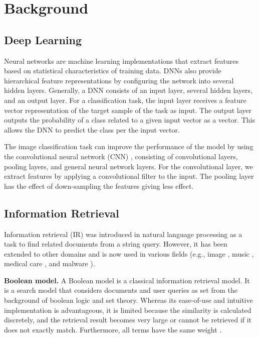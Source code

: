 \section{Background}

\subsection{Deep Learning }

Neural networks are machine learning implementations that extract features based on statistical characteristics of training data. DNNs also provide hierarchical feature representations by configuring the network into several hidden layers. Generally, a DNN consists of an input layer, several hidden layers, and an output layer. For a classification task, the input layer receives a feature vector representation of the target sample of the task as input. The output layer outputs the probability of a class related to a given input vector as a vector. This allows the DNN to predict the class per the input vector.
 
The image classification task can improve the performance of the model by using the convolutional neural network (CNN) \cite{krizhevsky2012imagenet}, consisting of convolutional layers, pooling layers, and general neural network layers. For the convolutional layer, we extract features by applying a convolutional filter to the input. The pooling layer has the effect of down-sampling the features giving less effect.


\subsection{Information Retrieval}
Information retrieval (IR) was introduced in natural language processing as a task to find related documents from a string query. However, it has been extended to other domains and is now used in various fields (e.g., image \cite{datta2008image, yu2015learning}, music \cite{schedl2014music}, medical care \cite{goeuriot2016medical, mourao2015multimodal}, and malware \cite{santos2013noa}).

\textbf{Boolean model.} A Boolean model is a classical information retrieval model. It is a search model that considers documents and user queries as set from the background of boolean logic and set theory. Whereas its ease-of-use and intuitive implementation is advantageous, it is limited because the similarity is calculated discretely, and the retrieval result becomes very large or cannot be retrieved if it does not exactly match. Furthermore, all terms have the same weight \cite{lashkari2009boolean} .
	


